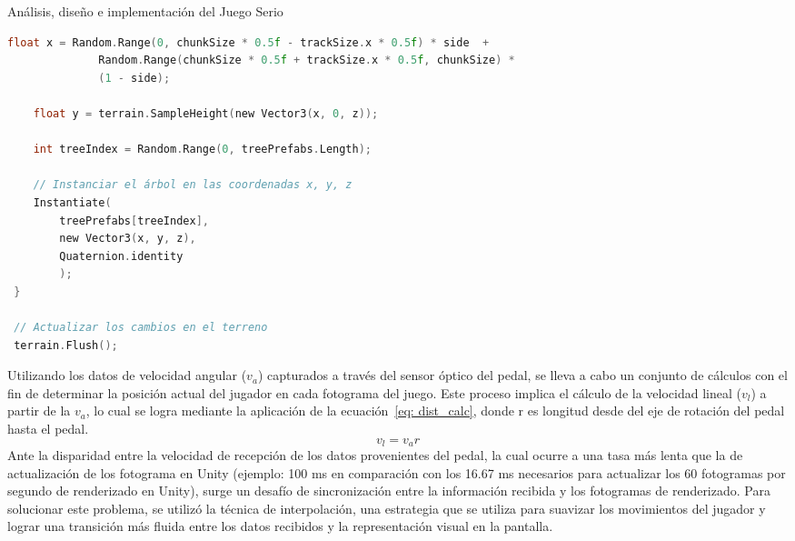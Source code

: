 \begin{thesischapter}{2} {Análisis, diseño e implementación del Juego Serio}
\begin{center}
\begin{minipage}{0.8\textwidth}
\begin{lstlisting}[language=c, caption={Posicionar árboles}]
    float x = Random.Range(0, chunkSize * 0.5f - trackSize.x * 0.5f) * side  +
              Random.Range(chunkSize * 0.5f + trackSize.x * 0.5f, chunkSize) * 
              (1 - side);

    float y = terrain.SampleHeight(new Vector3(x, 0, z)); 

    int treeIndex = Random.Range(0, treePrefabs.Length);
    
    // Instanciar el árbol en las coordenadas x, y, z 
    Instantiate(
        treePrefabs[treeIndex], 
        new Vector3(x, y, z), 
        Quaternion.identity
        );
 }

 // Actualizar los cambios en el terreno
 terrain.Flush();
\end{lstlisting}
\end{minipage}  
\end{center}


\vspace{10pt}
Utilizando los datos de velocidad angular ($v_{a}$) capturados a través del sensor óptico del pedal, se lleva a 
cabo un conjunto de cálculos con el fin de determinar la posición actual del jugador en cada fotograma 
del juego. Este proceso implica el cálculo de la velocidad lineal ($v_{l}$) a partir de la $v_{a}$, lo 
cual se logra mediante la aplicación de la ecuación~\ref{eq: dist_calc}, donde r es longitud desde del eje de rotación del pedal hasta el pedal.
\begin{equation}
    v_{l} = v_{a}r
    \label{eq: dist_calc}        
\end{equation}
Ante la disparidad entre la velocidad de recepción de los datos provenientes del pedal, la cual ocurre a una tasa más lenta que la de actualización de los fotograma en Unity
(ejemplo: 100 ms en comparación con los 16.67 ms necesarios para actualizar los 60 fotogramas por segundo de renderizado en Unity), surge un desafío de sincronización entre la información 
recibida y los fotogramas de renderizado. Para solucionar este problema, se utilizó la técnica de interpolación, una estrategia que se utiliza para suavizar los movimientos 
del jugador y lograr una transición más fluida entre los datos recibidos y la representación visual en la pantalla.


\end{thesischapter}
